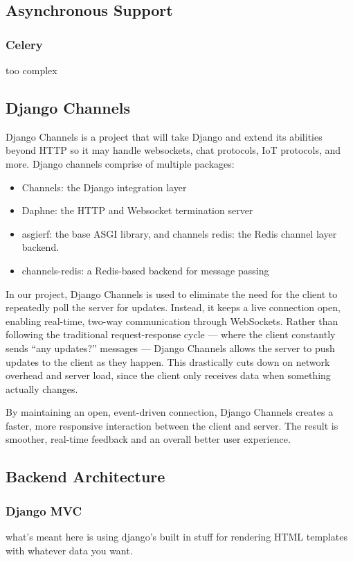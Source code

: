 \documentclass[12pt]{article}
\begin{document}
\subsection{Asynchronous Support}

\subsubsection{Celery}
too complex

\subsection{Django Channels}
Django Channels is a project that will take Django and extend its abilities beyond HTTP so it may handle
websockets, chat protocols, IoT protocols, and more. 
Django channels comprise of multiple packages:
\begin{itemize}
    \item Channels: the Django integration layer
    \item Daphne: the HTTP and Websocket termination server
    \item asgierf: the base ASGI library, and channels redis: the Redis channel layer backend.
    \item channels-redis: a Redis-based backend for message passing
\end{itemize} 

In our project, Django Channels is used to eliminate the need for the client to repeatedly poll the server for updates.
Instead, it keeps a live connection open, enabling real-time, two-way communication through WebSockets.
Rather than following the traditional request-response cycle — where the client constantly sends “any updates?” messages —
Django Channels allows the server to push updates to the client as they happen.
This drastically cuts down on network overhead and server load, since the client only receives data when something actually changes.

By maintaining an open, event-driven connection, Django Channels creates a faster,
more responsive interaction between the client and server.
The result is smoother, real-time feedback and an overall better user experience.

\subsection{Backend Architecture}

\subsubsection{Django MVC}
what's meant here is using django's built in stuff for rendering HTML templates with whatever data you want.
\end{document}
